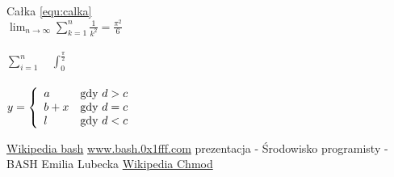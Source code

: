 \documentclass[a4paper,11pt]{article}
\begin{document}
Całka \ref{equ:calka} \\
$\lim_{n \to \infty}
\sum_{k=1}^n \frac{1}{k^2}
= \frac{\pi^2}{6}
$
\\ \\
$
\sum_{i=1}^{n} \quad
\int_{0}^{\frac{\pi}{2}}
\label{equ:calka}
$ \\ \\ 
$y = \left\{ \begin{array}{ll}
a & \textrm{gdy $d>c$}\\
b+x & \textrm{gdy $d=c$}\\
l & \textrm{gdy $ d < c $}
\end{array} \right.
$

\newpage


\begin{thebibliography}{99}
 \href{http://pl.wikipedia.org/wiki/Bash}{Wikipedia bash} 
 \href{http://bash.0x1fff.com/zmienne-systemowe}{www.bash.0x1fff.com}
 prezentacja - Środowisko programisty - BASH  Emilia Lubecka
 \href{http://pl.wikipedia.org/wiki/Chmod}{Wikipedia Chmod} 
\end{thebibliography}
\end{document}
